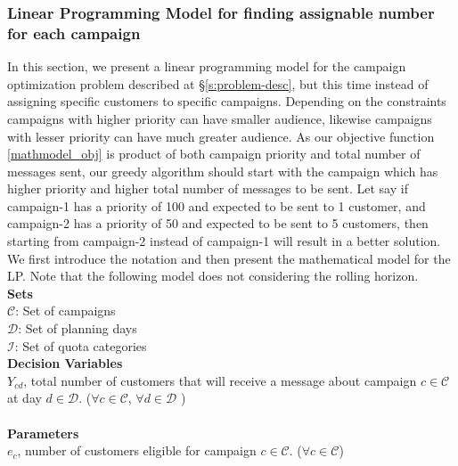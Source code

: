 \documentclass[11pt]{article}
\begin{document}
\subsubsection{Linear Programming Model for finding assignable number for each campaign} \label{s:problem-math-lp}

In this section, we present a linear programming model for the campaign optimization problem described at \S \ref{s:problem-desc}, but this time instead of assigning specific customers to specific campaigns. Depending on the constraints campaigns with higher priority can have smaller audience, likewise campaigns with lesser priority can have much greater audience. As our objective function \eqref{mathmodel_obj} is product of both campaign priority and total number of messages sent, our greedy algorithm should start with the campaign which has higher priority and higher total number of messages to be sent. Let say if campaign-1 has a priority of 100 and expected to be sent to 1 customer, and campaign-2 has a priority of 50 and expected to be sent to 5 customers, then starting from campaign-2 instead of campaign-1 will result in a better solution.
\\
We first introduce the notation and then present the mathematical model for the LP. Note that the following model does not considering the rolling horizon.\\

\noindent \textbf{Sets}\\

\noindent ${\mathcal{C}}$: Set of campaigns \\
\noindent ${\mathcal{D}}$: Set of planning days \\
\noindent ${\mathcal{I}}$: Set of quota categories \\

\noindent \textbf{Decision Variables}\\

\noindent $Y_{{c}{d}}$, total number of customers that will receive a message about campaign $c \in \mathcal{C}$ at day $d \in \mathcal{D}$.
($\forall c \in \mathcal{C}$, $\forall d \in \mathcal{D}$ )\\
\\

\noindent \textbf{Parameters}\\

\noindent $e_{c}$, number of customers eligible for campaign $c \in \mathcal{C}$.
($\forall c \in \mathcal{C}$)\\
\end{document}
